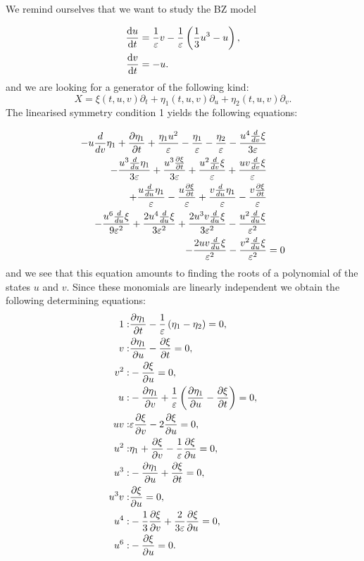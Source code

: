 We remind ourselves that we want to study the BZ model

\begin{equation*}
  \begin{split}
    \dv{u}{t}&=\dfrac{1}{\varepsilon}v-\dfrac{1}{\varepsilon}\left(\dfrac{1}{3}u^3-u\right),\\
    \dv{v}{t}&=-u.\\    
    \end{split}
\end{equation*}
and we are looking for a generator of the following kind:
\begin{equation}
X=\xi(t,u,v)\partial_t+\eta_1(t,u,v)\partial_u+\eta_2(t,u,v)\partial_v.
\end{equation}
The linearised symmetry condition 1 yields the following equations:


\begin{align}
  - u \frac{d}{d v} \eta_1 + \pdv{\eta_1}{t} + \frac{\eta_1 u^{2}}{\varepsilon} - \frac{\eta_1}{\varepsilon} - \frac{\eta_2}{\varepsilon} - \frac{u^{4} \frac{d}{d v} \xi}{3 \varepsilon}&\nonumber\\
  - \frac{u^{3} \frac{d}{d u} \eta_1}{3 \varepsilon} + \frac{u^{3} \pdv{\xi}{t}}{3 \varepsilon} + \frac{u^{2} \frac{d}{d v} \xi}{\varepsilon} + \frac{u v \frac{d}{d v} \xi}{\varepsilon}&\nonumber\\
  + \frac{u \frac{d}{d u} \eta_1}{\varepsilon} - \frac{u \pdv{\xi}{t}}{\varepsilon} + \frac{v \frac{d}{d u} \eta_1}{\varepsilon} - \frac{v\pdv{\xi}{t}}{\varepsilon}&\nonumber\\
  - \frac{u^{6} \frac{d}{d u} \xi}{9 \varepsilon^{2}} + \frac{2 u^{4} \frac{d}{d u} \xi}{3 \varepsilon^{2}} + \frac{2 u^{3} v \frac{d}{d u} \xi}{3 \varepsilon^{2}} - \frac{u^{2} \frac{d}{d u} \xi}{\varepsilon^{2}}&\nonumber\\
  - \frac{2 u v \frac{d}{d u} \xi}{\varepsilon^{2}} - \frac{v^{2} \frac{d}{d u} \xi}{\varepsilon^{2}}&=0\label{eq:BZ_lin_sym_1}
\end{align}
and we see that this equation amounts to finding the roots of a polynomial of the states $u$ and $v$. Since these monomials are linearly independent we obtain the following determining equations:
\begin{align}
  1:&\pdv{\eta_1}{t} - \frac{1}{\varepsilon}\left(\eta_1 - \eta_2\right)=0,\\
  v:&\pdv{\eta_1}{u} - \pdv{\xi}{t}=0,\\
  v^{2}:&- \pdv{\xi}{u}=0,\\
  u:&-\pdv{\eta_1}{v} + \frac{1}{\varepsilon}\left(\pdv{\eta_1}{u}  - \pdv{\xi}{t}\right)=0,\\  
  u v:&\varepsilon\pdv{\xi}{v} - 2 \pdv{\xi}{u}=0,\\
  u^{2}:&\eta_1 + \pdv{\xi}{v} - \frac{1}{\varepsilon} \pdv{\xi}{u}=0,\\
  u^{3}:&- \pdv{\eta_1}{u} + \pdv{\xi}{t}=0,\\
u^{3} v:&\pdv{\xi}{u}=0,\\
 u^{4}:&- \frac{1}{3}\pdv{\xi}{v} + \frac{2}{3 \varepsilon}\pdv{\xi}{u}=0,\\
 u^{6}:&- \pdv{\xi}{u}=0.\\
\end{align}

